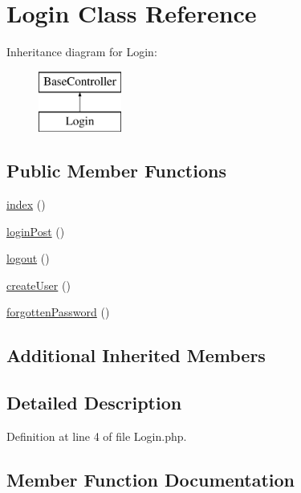 \hypertarget{class_login}{}\section{Login Class Reference}
\label{class_login}
Inheritance diagram for Login\+:\begin{figure}[H]
\begin{center}
\leavevmode
\includegraphics[height=2.000000cm]{class_login}
\end{center}
\end{figure}
\subsection*{Public Member Functions}
\begin{DoxyCompactItemize}
\item 
\hyperlink{class_login_a149eb92716c1084a935e04a8d95f7347}{index} ()
\item 
\hyperlink{class_login_a94f6c4408a4c944655e54b36a33ae4b9}{login\+Post} ()
\item 
\hyperlink{class_login_a082405d89acd6835c3a7c7a08a7adbab}{logout} ()
\item 
\hyperlink{class_login_a967982ee98f05287bbdba812f6016947}{create\+User} ()
\item 
\hyperlink{class_login_a2ee0222a0eb00f2530a3281462ca0e46}{forgotten\+Password} ()
\end{DoxyCompactItemize}
\subsection*{Additional Inherited Members}


\subsection{Detailed Description}


Definition at line 4 of file Login.\+php.



\subsection{Member Function Documentation}
\hypertarget{class_login_a967982ee98f05287bbdba812f6016947}{}\label{class_login_a967982ee98f05287bbdba812f6016947} 
